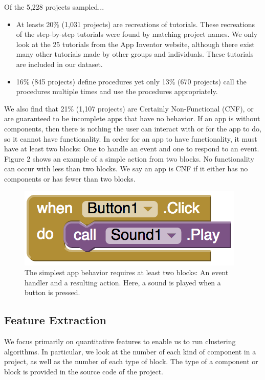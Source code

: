 \documentclass[conference]{IEEEtran}
\begin{document}
Of the 5,228 projects sampled...
\begin{itemize}
	\item At leasts 20\% (1,031 projects) are recreations of tutorials. These recreations of the step-by-step tutorials were found by matching project names. We only look at the 25 tutorials from the App Inventor website, although there exist many other tutorials made by other groups and individuals. These tutorials are included in our dataset.
	\item 16\% (845 projects) define procedures yet only 13\% (670 projects) call the procedures multiple times and use the procedures appropriately.	
\end{itemize}

We also find that 21\% (1,107 projects) are Certainly Non-Functional (CNF), or are guaranteed to be incomplete apps that have no behavior. If an app is without components, then there is nothing the user can interact with or for the app to do, so it cannot have functionality. In order for an app to have functionality, it must have at least two blocks: One to handle an event and one to respond to an event. Figure 2 shows an example of a simple action from two blocks. No functionality can occur with less than two blocks. We say an app is CNF if it either has no components or has fewer than two blocks.

\begin{figure}[h!]
	\centering
	\includegraphics[width=0.55\linewidth]{simple_blocks.png}
	\caption{The simplest app behavior requires at least two blocks: An event handler and a resulting action. Here, a sound is played when a button is pressed.}
	\label{FIgure 2: Most Basic Block Example}
\end{figure}

\subsection{Feature Extraction}
We focus primarily on quantitative features to enable us to run clustering algorithms. In particular, we look at the number of each kind of component in a project, as well as the number of each type of block. The type of a component or block is provided in the source code of the project. 
\end{document}
